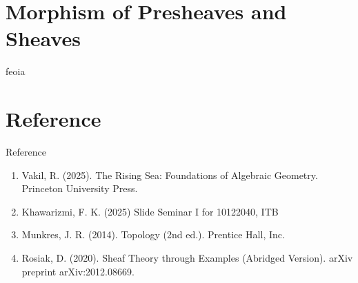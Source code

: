 \documentclass[10pt,aspectratio=1610]{beamer}
\theoremstyle{definition}
\begin{document}
    \section{Morphism of Presheaves and Sheaves}

    \begin{frame}
        feoia
    \end{frame}

    \section{Reference}

    \begin{frame}{Reference}
        \begin{enumerate}
            \item Vakil, R. (2025). The Rising Sea: Foundations of Algebraic Geometry. Princeton University Press.
            \item Khawarizmi, F. K. (2025) Slide Seminar I for 10122040, ITB
            \item Munkres, J. R. (2014). Topology (2nd ed.). Prentice Hall, Inc.
            \item Rosiak, D. (2020). Sheaf Theory through Examples (Abridged Version). arXiv preprint arXiv:2012.08669.
        \end{enumerate}
    \end{frame}
    
    
\end{document}
